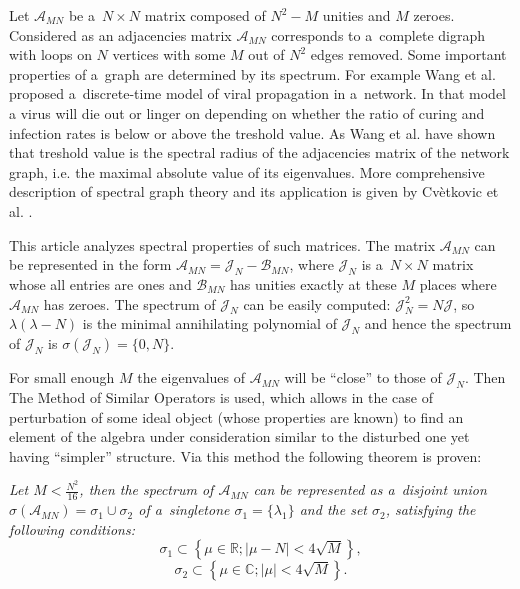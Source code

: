 Let \( \mathscr{A}_{MN} \) be a~\( N\times N \) matrix composed of
\( N^2 - M \) unities and \( M \) zeroes.
Considered as an adjacencies matrix \( \mathscr{A}_{MN} \)
corresponds to a~complete digraph with loops on \( N \) vertices
with some \( M \) out of \( N^2 \) edges removed.
Some important properties of a~graph are determined by its spectrum.
For example Wang et al. \cite{epidemic} proposed a~discrete-time model
of viral propagation in a~network.
In that model a virus will die out or linger on
depending on whether the ratio of curing and infection rates
is below or above the treshold value.
As Wang et al. have shown that treshold value
is the spectral radius of the adjacencies matrix of the network graph,
i.e. the maximal absolute value of its eigenvalues.
More comprehensive description of spectral graph theory
and its application is given by Cv\`etkovic et al. \cite{cvet}.

This article analyzes spectral properties of such matrices.
The matrix \( \mathscr{A}_{MN} \) can be represented in the form
\( \mathscr{A}_{MN} = \mathcal{J}_N - \mathscr{B}_{MN} \),
where \( \mathcal{J}_N \) is a~\( N\times N \) matrix
whose all entries are ones
and \( \mathcal{B}_{MN} \) has unities exactly at these \( M \)
places where \( \mathscr{A}_{MN} \) has zeroes.
The spectrum of \( \mathcal{J}_N \) can be easily computed:
\( \mathcal{J}_N^2 = N \mathcal{J} \),
so \( \lambda(\lambda - N) \) is the minimal
annihilating polynomial of \( \mathcal{J}_N \)
and hence the spectrum of \( \mathcal{J}_{N} \) is
\( \sigma(\mathcal{J}_N) = \{ 0,N \} \).

For small enough \( M \) the eigenvalues of \( \mathscr{A}_{MN} \)
will be ``close'' to those of \( \mathcal{J}_N \).
Then The Method of Similar Operators \cite{baskakov-harmonic,baskakov-split} is used,
which allows in the case of perturbation of some ideal object (whose properties are known)
to find an element of the algebra under consideration similar to the disturbed one
yet having ``simpler'' structure.
Via this method the following theorem is proven:
\begin{center}
\it
    Let \( M < \frac{N^2}{16} \),
    then the spectrum of \( \mathscr{A}_{MN} \) can be represented as a~disjoint union
    \( \sigma\left(\mathscr{A}_{MN}\right) = \sigma_1 \cup \sigma_2 \)
    of a~singletone \( \sigma_1=\{\lambda_1\} \)
    and the set \( \sigma_2 \), satisfying the following conditions:
    \[ \sigma_1 \subset \left\{ \mu\in\mathbb{R}; \lvert \mu - N \rvert < 4\sqrt{M} \right\}, \]
    \[ \sigma_2 \subset \left\{ \mu\in\mathbb{C}; \lvert \mu \rvert < 4\sqrt{M} \right\}. \]
\end{center}
